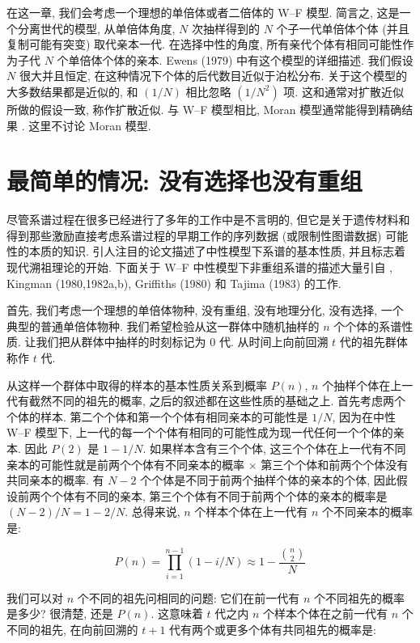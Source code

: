 \documentclass[12pt]{article}
\begin{document}
在这一章, 我们会考虑一个理想的单倍体或者二倍体的 W--F 模型. 简言之, 这是一个分离世代的模型, 从单倍体角度,
$N$ 次抽样得到的 $N$ 个子一代单倍体个体 (并且复制可能有突变) 取代亲本一代. 在选择中性的角度,
所有亲代个体有相同可能性作为子代 $N$ 个单倍体个体的亲本. Ewens (1979) 中有这个模型的详细描述.
我们假设 $N$ 很大并且恒定, 在这种情况下个体的后代数目近似于泊松分布. 关于这个模型的大多数结果都是近似的, 和
$(1/N)$ 相比忽略 $(1/N^{2})$ 项. 这和通常对扩散近似所做的假设一致, 称作扩散近似. 与 W--F
模型相比, Moran 模型通常能得到精确结果 \parencite{watterson1975}. 这里不讨论
Moran 模型.

\section{最简单的情况: 没有选择也没有重组}

尽管系谱过程在很多已经进行了多年的工作中是不言明的,
但它是关于遗传材料和得到那些激励直接考虑系谱过程的早期工作的序列数据 (或限制性图谱数据) 可能性的本质的知识.
\cite{watterson1975} 引人注目的论文描述了中性模型下系谱的基本性质, 并且标志着现代溯祖理论的开始.
下面关于 W--F 中性模型下非重组系谱的描述大量引自 \cite{watterson1975}, Kingman
(1980,1982a,b), Griffiths (1980) 和 Tajima (1983) 的工作.

首先, 我们考虑一个理想的单倍体物种, 没有重组, 没有地理分化, 没有选择, 一个典型的普通单倍体物种.
我们希望检验从这一群体中随机抽样的 $n$ 个个体的系谱性质. 让我们把从群体中抽样的时刻标记为 0 代.
从时间上向前回溯 $t$ 代的祖先群体称作 $t$ 代.

从这样一个群体中取得的样本的基本性质关系到概率 $P(n)$, $n$ 个抽样个体在上一代有截然不同的祖先的概率,
之后的叙述都在这些性质的基础之上. 首先考虑两个个体的样本. 第二个个体和第一个个体有相同亲本的可能性是 $1/N$,
因为在中性 W--F 模型下, 上一代的每一个个体有相同的可能性成为现一代任何一个个体的亲本. 因此 $P(2)$ 是
$1-1/N$. 如果样本含有三个个体, 这三个个体在上一代有不同亲本的可能性就是前两个个体有不同亲本的概率
$\times$ 第三个个体和前两个个体没有共同亲本的概率. 有 $N-2$ 个个体是不同于前两个抽样个体的亲本的个体,
因此假设前两个个体有不同的亲本, 第三个个体有不同于前两个个体的亲本的概率是 $(N-2)/N=1-2/N$.
总得来说, $n$ 个样本个体在上一代有 $n$ 个不同亲本的概率是:

\begin{equation} \label{eq:3}
    P(n) = \prod_{i=1}^{n-1}(1-i/N) \approx 1-\frac{\binom{n}{2}}{N}
\end{equation}

我们可以对 $n$ 个不同的祖先问相同的问题: 它们在前一代有 $n$ 个不同祖先的概率是多少? 很清楚, 还是 $P(n)$. 这意味着 $t$
代之内 $n$ 个样本个体在之前一代有 $n$ 个不同的祖先, 在向前回溯的 $t+1$ 代有两个或更多个体有共同祖先的概率是:
\end{document}
